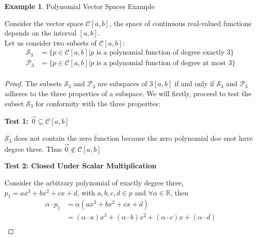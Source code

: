 \documentclass{book}
\theoremstyle{definition}
\newtheorem{example}{Example}[definition]
\theoremstyle{remark}
\newcommand{\bb}[1]{\mathbb{#1}}
\newcommand{\cc}[1]{\mathcal{#1}}
\newcommand{\m}{\cdot}
\begin{document}
\newpage
\begin{example}
Polynomial Vector Spaces Example \\

    \begin{tcolorbox}
        Consider the vector space $\cc{C}[a,b]$, the space of continuous real-valued functions depends on the interval $[a,b]$. \\
        Let us consider two subsets of $\cc{C}[a,b]$: \\
            \begin{align*}
                \cc{S}_3 & = \{ p \in \cc{C}[a,b] | p \text{ is a polynomial function of degree exactly $3$} \} \\
                \cc{P}_3 & = \{ p \in \cc{C}[a,b] | p \text{ is a polynomial function of degree at most $3$} \} \\
            \end{align*}
    \end{tcolorbox}
        
    \begin{proof}    
        The subsets $\cc{S}_3$ and $\cc{P}_3$ are subspaces of $\cc{3}[a,b]$ if and only if $\cc{S}_3$ and $\cc{P}_3$ adheres to the three properties of a subspace. We will firstly, proceed to test the subset $\cc{S}_3$ for conformity with the three properites: \\
        
        \begin{flushleft} \textbf{Test 1: $\vec{0} \subseteq \cc{C}[a,b]$} \end{flushleft}
            $\cc{S}_3$ does not contain the zero function because the zero polynomial doe snot have degree three. Thus $\vec{0} \notin \cc{C}[a,b]$ 
    
        \begin{flushleft} \textbf{Test 2: Closed Under Scalar Multiplication} \end{flushleft}
            Consider the arbitrary polynomial of exactly degree three, $p_1 = ax^3 + bx^2 + cx + d$, with $a,b,c,d \in p$ and $\forall \alpha \in \bb{R}$, then 
                \begin{align*}
                    \alpha \m p_1 & = \alpha(ax^3 + bx^2 + cx + d) \\
                        & = (\alpha \m a)x^3 + (\alpha \m b)x^2 + (\alpha \m c)x + (\alpha \m d) \\
                \end{align*}
            

\end{proof}
\end{example}
\end{document}
